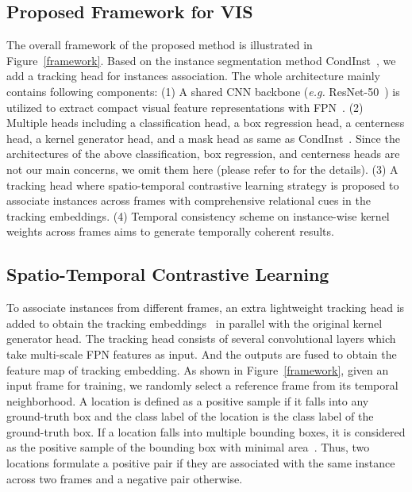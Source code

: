 \documentclass[runningheads]{llncs}
\begin{document}
\subsection{Proposed Framework for VIS}
The overall framework of the proposed method is illustrated in Figure~\ref{framework}. Based on the instance segmentation method CondInst~\cite{tian2020conditional}, we add a tracking head for instances association. The whole architecture mainly contains following components: (1) A shared CNN backbone (\emph{e.g.} ResNet-50~\cite{he2016deep}) is utilized to extract compact visual feature representations with FPN~\cite{lin2017feature}. (2) Multiple heads including a classification head, a box regression head, a centerness head, a kernel generator head, and a mask head as same as CondInst~\cite{tian2020conditional}. Since the architectures of the above classification, box regression, and centerness heads are not our main concerns, we omit them here (please refer to \cite{tian2019fcos} for the details). (3) A tracking head where spatio-temporal contrastive learning strategy is proposed to associate instances across frames with comprehensive relational cues in the tracking embeddings. (4) Temporal consistency scheme on instance-wise kernel weights across frames aims to generate temporally coherent results.

\subsection{Spatio-Temporal Contrastive Learning}
To associate instances from different frames, an extra lightweight tracking head is added to obtain the tracking embeddings~\cite{yang2019video,cao2020sipmask,fu2020compfeat} in parallel with the original kernel generator head. The tracking head consists of several convolutional layers which take multi-scale FPN features  as input. And the outputs are fused to obtain the feature map of tracking embedding. As shown in Figure~\ref{framework}, given an input frame  for training, we randomly select a reference frame  from its temporal neighborhood. A location is defined as a positive sample if it falls into any ground-truth box and the class label  of the location is the class label of the ground-truth box. If a location falls into multiple bounding boxes, it is considered as the positive sample of the bounding box with minimal area~\cite{tian2019fcos}. Thus, two locations formulate a positive pair if they are associated with the same instance across two frames and a negative pair otherwise.
\end{document}
